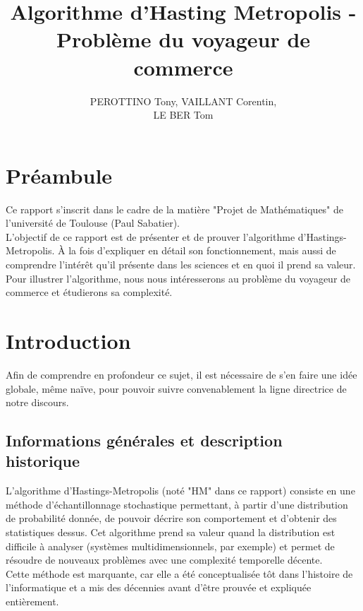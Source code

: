 \documentclass{article}
\title{Algorithme d'Hasting Metropolis - Problème du voyageur de commerce}
\author{PEROTTINO Tony, VAILLANT Corentin, \\ LE BER Tom}
\begin{document}
\maketitle

\newpage
\tableofcontents
\newpage

\section*{Préambule}

Ce rapport s'inscrit dans le cadre de la matière "Projet de Mathématiques" de l'université de Toulouse (Paul Sabatier). \\
L'objectif de ce rapport est de présenter et de prouver l'algorithme d'Hastings-Metropolis. À la fois d'expliquer en détail son fonctionnement, mais aussi de comprendre l'intérêt qu'il présente dans les sciences et en quoi il prend sa valeur. \\
Pour illustrer l'algorithme, nous nous intéresserons au problème du voyageur de commerce et étudierons sa complexité.


\section{Introduction}

Afin de comprendre en profondeur ce sujet, il est nécessaire de s'en faire une idée globale, même naïve, pour pouvoir suivre convenablement la ligne directrice de notre discours.

\subsection{Informations générales et description historique}

L'algorithme d'Hastings-Metropolis (noté "HM" dans ce rapport) consiste en une méthode d'échantillonnage stochastique permettant, à partir d'une distribution de probabilité donnée, de pouvoir décrire son comportement et d'obtenir des statistiques dessus. Cet algorithme prend sa valeur quand la distribution est difficile à analyser (systèmes multidimensionnels, par exemple) et permet de résoudre de nouveaux problèmes avec une complexité temporelle décente. \\
Cette méthode est marquante, car elle a été conceptualisée tôt dans l'histoire de l'informatique et a mis des décennies avant d'être prouvée et expliquée entièrement. \\
\end{document}
